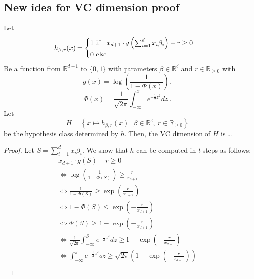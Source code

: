 \newpage

\subsection{New idea for VC dimension proof}

\begin{lemma}
    Let
    \begin{equation*}
        h_{\beta, r}(x) =
        \begin{cases}
            1 \ \textup{if} \quad x_{d+1} \cdot g\left( \sum_{i=1}^d x_i \beta_i \right) - r \geq 0 \\
            0 \ \textup{else}
        \end{cases}
    \end{equation*}
    Be a function from $\mathbb{R}^{d+1}$ to $\{0, 1\}$ with parameters
    $\beta \in \mathbb{R}^d$ and $r \in \mathbb{R}_{\geq 0}$ with
    \begin{equation*}
        g(x) = \log\left( \frac{1}{1 - \Phi(x)}\right),
    \end{equation*}
    \begin{equation*}
        \Phi(x) = \frac{1}{\sqrt{2 \pi}} \int_{-\infty}^x e^{-\frac{1}{2}z^2}dz\ .
    \end{equation*}
    Let
    \begin{equation*}
        H = \left\{ x \mapsto h_{\beta, r}(x) \ |\ \beta \in \mathbb{R}^{d},\ r \in \mathbb{R}_{\geq 0} \right\}
    \end{equation*}
    be the hypothesis class determined by $h$. Then, the VC dimension of $H$ is \ldots
\end{lemma}
\begin{proof}
    Let $S = \sum_{i=1}^d x_i \beta_i$. We show that $h$ can be computed in
    $t$ steps as follows:
    \begin{gather*}
        x_{d+1} \cdot g\left( S \right) - r                            \geq 0                                      \\
        \iff  \log\left( \frac{1}{1 - \Phi(S)}\right)                        \geq \frac{r}{x_{d+1}}                      \\
        \iff  \frac{1}{1 - \Phi(S)}                                          \geq \exp\left(\frac{r}{x_{d+1}}\right)     \\
        \iff  1 - \Phi(S)                                                    \leq \exp\left(-\frac{r}{x_{d+1}}\right)    \\
        \iff  \Phi(S)                                                        \geq 1 -\exp\left(-\frac{r}{x_{d+1}}\right) \\
        \iff  \frac{1}{\sqrt{2 \pi}} \int_{-\infty}^S e^{-\frac{1}{2}z^2}dz  \geq 1 -\exp\left(-\frac{r}{x_{d+1}}\right) \\
        \iff   \int_{-\infty}^S e^{-\frac{1}{2}z^2}dz  \geq \sqrt{2 \pi}\left(1 -\exp\left(-\frac{r}{x_{d+1}}\right)\right) \\
    \end{gather*}
\end{proof}

